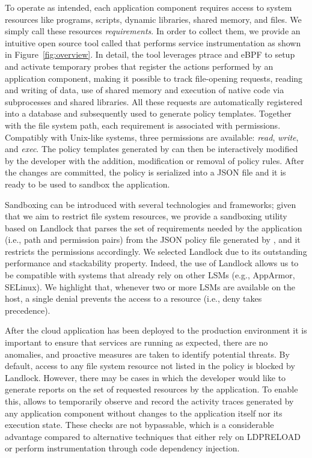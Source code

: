 To operate as intended, each application component requires access to
system resources like programs, scripts, dynamic libraries, shared
memory, and files. We simply call these resources {\em requirements}.
In order to collect them, we provide an intuitive open source tool
called \dmng that performs service instrumentation as shown in
Figure~\ref{fig:overview}.  In detail, the tool leverages ptrace and
eBPF to setup and activate temporary probes that register the actions
performed by an application component, making it possible to track
file-opening requests, reading and writing of data, use of shared
memory and execution of native code via subprocesses and shared
libraries. All these requests are automatically registered into a
database and subsequently used to generate policy templates. Together
with the file system path, each requirement is associated with
permissions. Compatibly with Unix-like systems, three permissions are
available: {\em read}, {\em write}, and {\em exec}. The policy
templates generated by \dmng can then be interactively modified by the
developer with the addition, modification or removal of policy
rules. After the changes are committed, the policy is serialized into
a JSON file and it is ready to be used to sandbox the application.

Sandboxing can be introduced with several technologies and frameworks;
given that we aim to restrict file system resources, we provide a
sandboxing utility based on Landlock that parses the set of
requirements needed by the application (i.e., path and permission
pairs) from the JSON policy file generated by \dmng, and it restricts
the permissions accordingly. We selected Landlock due to its
outstanding performance and stackability property.  Indeed, the use of
Landlock allows us to be compatible with systems that already rely on
other LSMs (e.g., AppArmor, SELinux).  We highlight that, whenever two
or more LSMs are available on the host, a single denial prevents the
access to a resource (i.e., deny takes precedence).

After the cloud application has been deployed to the production
environment it is important to ensure that services are running as
expected, there are no anomalies, and proactive measures are taken to
identify potential threats. By default, access to any file system
resource not listed in the policy is blocked by Landlock. However,
there may be cases in which the developer would like to generate
reports on the set of requested resources by the application. To
enable this, \dmng allows to temporarily observe and record the
activity traces generated by any application component without changes
to the application itself nor its execution state. These checks are
not bypassable, which is a considerable advantage compared to
alternative techniques that either rely on LD\textunderscore PRELOAD
or perform instrumentation through code dependency injection.

